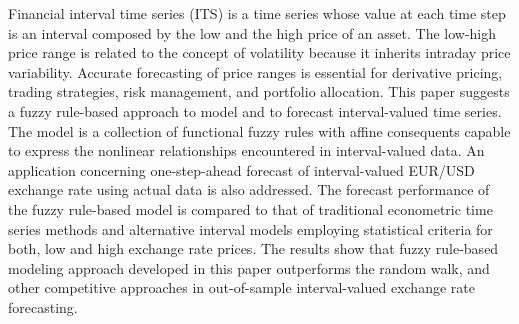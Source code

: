  Financial interval time series (ITS) is a time series whose value at each time step is an interval composed by the low and the high price of an asset. The low-high price range is related to the concept of volatility because it inherits intraday price variability. Accurate forecasting of price ranges is essential for derivative pricing, trading strategies, risk management, and portfolio allocation. This paper suggests a fuzzy rule-based approach to model and to forecast interval-valued time series. The model is a collection of functional fuzzy rules with affine consequents capable to express the nonlinear relationships encountered in interval-valued data. An application concerning one-step-ahead forecast of interval-valued EUR/USD exchange rate using actual data is also addressed.  The forecast performance of the fuzzy rule-based model is compared to that of traditional econometric time series methods and alternative interval models employing statistical criteria for both, low and high exchange rate prices. The results show that fuzzy rule-based modeling approach developed in this paper outperforms the random walk, and other competitive approaches in out-of-sample interval-valued exchange rate forecasting.


